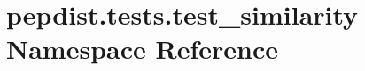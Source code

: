 \hypertarget{namespacepepdist_1_1tests_1_1test__similarity}{}\section{pepdist.\+tests.\+test\+\_\+similarity Namespace Reference}
\label{namespacepepdist_1_1tests_1_1test__similarity}
